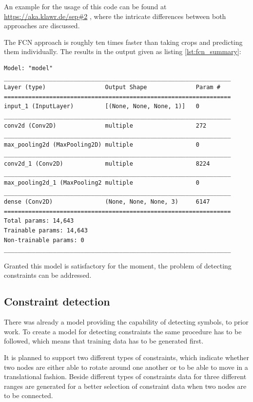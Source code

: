 An example for the usage of this code can be found at \url{https://aka.klawr.de/sep#2} %
, where the intricate differences between both approaches are discussed.

The FCN approach is roughly ten times faster than taking crops and predicting them individually. 
The  results in the output given as listing \ref{lst:fcn_summary}:

\begin{lstlisting}[label={lst:fcn_summary}, caption={Summary of Symbol Classifier transformed into a FCN.}]
Model: "model"
_________________________________________________________________
Layer (type)                 Output Shape              Param #   
=================================================================
input_1 (InputLayer)         [(None, None, None, 1)]   0         
_________________________________________________________________
conv2d (Conv2D)              multiple                  272       
_________________________________________________________________
max_pooling2d (MaxPooling2D) multiple                  0         
_________________________________________________________________
conv2d_1 (Conv2D)            multiple                  8224      
_________________________________________________________________
max_pooling2d_1 (MaxPooling2 multiple                  0         
_________________________________________________________________
dense (Conv2D)               (None, None, None, 3)     6147      
=================================================================
Total params: 14,643
Trainable params: 14,643
Non-trainable params: 0
_________________________________________________________________
\end{lstlisting}

Granted this model is satisfactory for the moment, the problem of detecting constraints can be addressed.

\subsection{Constraint detection}

There was already a model providing the capability of detecting symbols, to prior work.
To create a model for detecting constraints the same procedure has to be followed, which means that training data has to be generated first.

It is planned to support two different types of constraints, which indicate whether two nodes are either able to rotate around one another or to be able to move in a translational fashion.
Beside different types of constraints data for three different ranges are generated for a better selection of constraint data when two nodes are to be connected.

